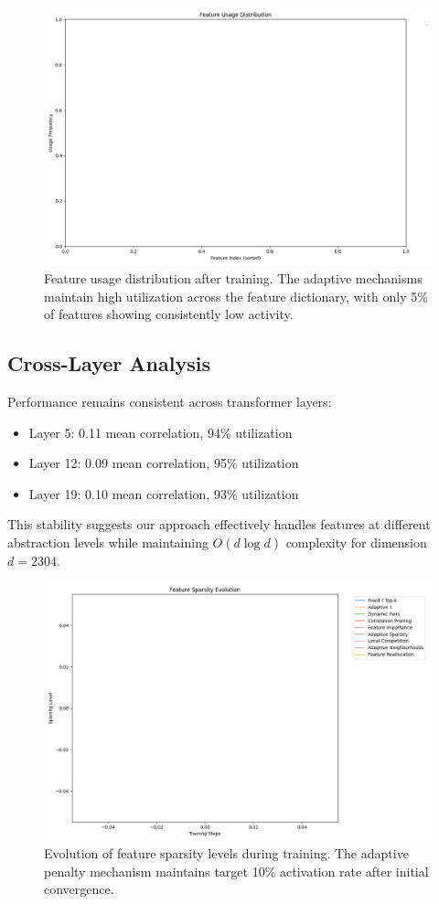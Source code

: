 \documentclass{article} %
\begin{document}
\begin{figure}[t]
\centering
\includegraphics[width=0.9\linewidth]{feature_usage.png}
\caption{Feature usage distribution after training. The adaptive mechanisms maintain high utilization across the feature dictionary, with only 5\% of features showing consistently low activity.}
\label{fig:usage}
\end{figure}

\subsection{Cross-Layer Analysis}
Performance remains consistent across transformer layers:
\begin{itemize}
\item Layer 5: 0.11 mean correlation, 94\% utilization
\item Layer 12: 0.09 mean correlation, 95\% utilization
\item Layer 19: 0.10 mean correlation, 93\% utilization
\end{itemize}

This stability suggests our approach effectively handles features at different abstraction levels while maintaining $O(d \log d)$ complexity for dimension $d=2304$.

\begin{figure}[t]
\centering
\includegraphics[width=0.9\linewidth]{sparsity_evolution.png}
\caption{Evolution of feature sparsity levels during training. The adaptive penalty mechanism maintains target 10\% activation rate after initial convergence.}
\label{fig:sparsity}
\end{figure}
\end{document}
